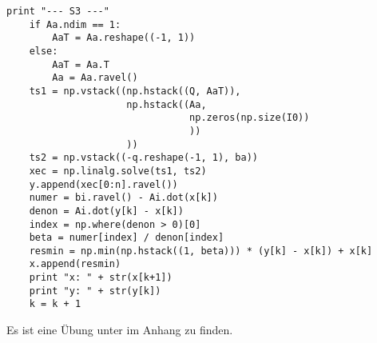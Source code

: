 \begin{exmp}
\begin{lstlisting}[style=PythonStyle, caption=Anwendung Aktive Mengen Algorithmus für \exmpref{exmp:kap_1_ama}, label=code:kap_1_active_set]
    print "--- S3 ---"
    if Aa.ndim == 1:
        AaT = Aa.reshape((-1, 1))
    else:
        AaT = Aa.T
        Aa = Aa.ravel()
    ts1 = np.vstack((np.hstack((Q, AaT)),
                     np.hstack((Aa,
                                np.zeros(np.size(I0))
                                ))
                     ))
    ts2 = np.vstack((-q.reshape(-1, 1), ba))
    xec = np.linalg.solve(ts1, ts2)
    y.append(xec[0:n].ravel())
    numer = bi.ravel() - Ai.dot(x[k])
    denon = Ai.dot(y[k] - x[k])
    index = np.where(denon > 0)[0]
    beta = numer[index] / denon[index]
    resmin = np.min(np.hstack((1, beta))) * (y[k] - x[k]) + x[k]
    x.append(resmin)
    print "x: " + str(x[k+1])
    print "y: " + str(y[k])
    k = k + 1
\end{lstlisting}
\end{exmp}
Es ist eine Übung unter  im Anhang zu finden.
